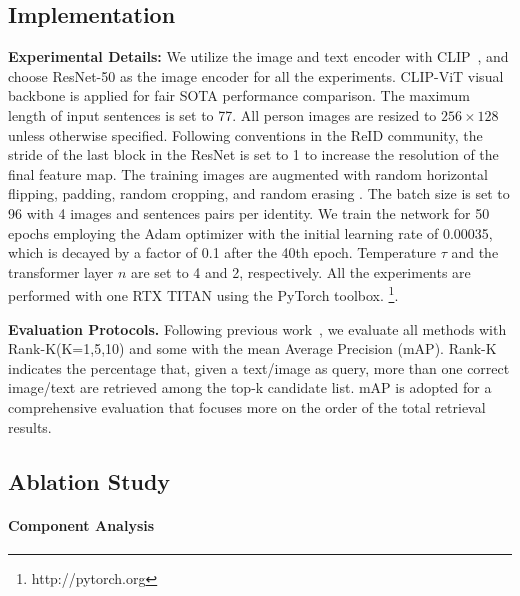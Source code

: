 \subsection{Implementation}

\textbf{Experimental Details:}
We utilize the image and text encoder with CLIP~\cite{clip}, and choose ResNet-50\cite{he2016resnet} as the image encoder for all the experiments. CLIP-ViT visual backbone is applied for fair SOTA performance comparison.
The maximum length of input sentences is set to 77.
All person images are resized to $256 \times 128$ unless otherwise specified. 
Following conventions in the ReID community, the stride of the last block in the ResNet is set to 1 to increase the resolution of the final feature map.
The training images are augmented with random horizontal flipping, padding, random cropping, and random erasing \cite{random_erase3}. 
The batch size is set to 96 with 4 images and sentences pairs per identity. 
We train the network for 50 epochs employing the Adam optimizer with the initial learning rate of 0.00035, which is decayed by a factor of 0.1 after the 40th epoch. 
Temperature $\tau$ and the transformer layer $n$ are set to 4 and 2, respectively. 
All the experiments are performed with one RTX TITAN using the PyTorch toolbox.
\footnote{http://pytorch.org}. 

\textbf{Evaluation Protocols.} Following previous work~\cite{textreid}, we evaluate all methods with Rank-K(K=1,5,10) and some with the mean Average Precision (mAP). 
Rank-K indicates the percentage that, given a text/image as query, more than one correct image/text are retrieved among the top-k candidate list.
mAP is adopted for a comprehensive evaluation that focuses more on the order of the total retrieval results.



\subsection{Ablation Study}

\paragraph{Component Analysis}


